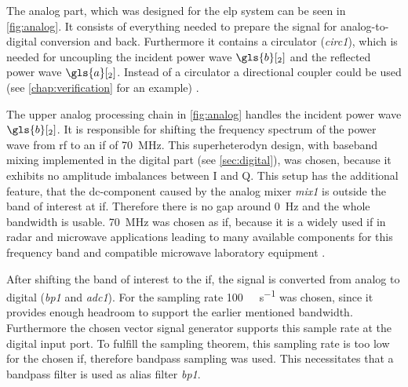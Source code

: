\documentclass[12pt,a4paper,parskip=full,abstract=true,BCOR=12mm,twoside,open=right]{scrreprt}
\def\device#1{\mbox{\textit{#1}}}
\begin{document}
The analog part, which was designed for the \gls{elp} system can be seen in
\cref{fig:analog}. It consists of everything needed to prepare the signal
for analog-to-digital conversion and back. Furthermore it contains a
circulator (\device{circ1}), which is needed for uncoupling the
incident power wave $\gls{b}[_2]$ and the reflected power wave $\gls{a}[_2]$. Instead of a
circulator a directional coupler could be used (see
\cref{chap:verification} for an example) \cite{ghannouchi_load-pull_2013}.

The upper analog processing chain in \cref{fig:analog} handles the
incident power wave $\gls{b}[_2]$. It is responsible for shifting the frequency spectrum
of the power wave from \gls{rf} to an \gls{if} of \SI{70}{\mega\hertz}. This
superheterodyn design, with baseband mixing implemented in the digital
part (see \cref{sec:digital}), was chosen, because it exhibits no amplitude
imbalances between I and Q. This setup has the additional feature, that
the \gls{dc}-component caused by the analog mixer \device{mix1} is outside the
band of interest at \gls{if}. Therefore there is no gap around \SI{0}{\hertz}
and the whole bandwidth is usable. \SI{70}{\mega\hertz} was chosen as \gls{if},
because it is a widely used \gls{if} in radar and microwave applications
\cite{tozer_broadcast_2004,ahamed_design_1997,whitaker_rf_2002,penttinen_telecommunications_2015}
leading to many available components for this frequency band and compatible microwave
laboratory equipment \cite{agilent_h70}.

After shifting the band of interest to the \gls{if}, the signal is converted from
analog to digital (\device{bp1} and \device{adc1}). For the sampling rate
\SI{100}{\mega\samples\per\second} was chosen, since it provides enough headroom to
support the earlier mentioned bandwidth. Furthermore the chosen vector signal generator supports this sample rate
at the digital input port. To fulfill the sampling theorem, this sampling rate is too low for the chosen
\gls{if}, therefore bandpass sampling was used. This necessitates that a bandpass
filter is used as alias filter \device{bp1}.
\end{document}
